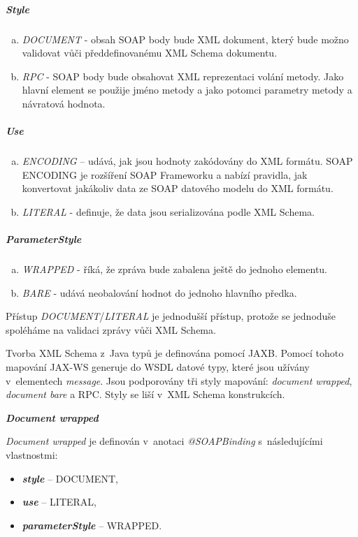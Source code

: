 \documentclass[11pt,twoside,a4paper]{book}
\begin{document}
\subparagraph{Style}
  	\begin{enumerate}[(a)]
  	  \item \textit{DOCUMENT} - obsah SOAP body bude XML dokument, který
  	  bude možno validovat vůči předdefinovanému XML Schema dokumentu.
  	  \item \textit{RPC} - SOAP body bude obsahovat XML reprezentaci volání
  	  metody.
Jako hlavní element se použije jméno metody a jako potomci parametry metody a
návratová hodnota.
	\end{enumerate}
\subparagraph{Use}
	\begin{enumerate}[(a)]
	  \item \textit{ENCODING} – udává, jak jsou hodnoty zakódovány do XML
	  formátu.
SOAP ENCODING je rozšíření SOAP Frameworku a nabízí pravidla, jak
konvertovat jakákoliv data ze SOAP datového modelu do XML formátu.
	  \item \textit{LITERAL} - definuje, že data jsou serializována podle
	  XML Schema.
	\end{enumerate}
\subparagraph{ParameterStyle}
	\begin{enumerate}[(a)]
	  \item \textit{WRAPPED} - říká, že zpráva bude zabalena ještě do
	  jednoho elementu.
	  \item \textit{BARE} - udává neobalování hodnot do jednoho hlavního
	  předka.
	\end{enumerate}

Přístup {\em DOCUMENT}/{\em LITERAL} je jednodušší přístup, protože se jednoduše
spoléháme na validaci zprávy vůči XML Schema.

Tvorba XML Schema z~Java typů je definována pomocí JAXB. Pomocí tohoto mapování
JAX-WS generuje do WSDL datové typy, které jsou užívány v~elementech {\em
message}. Jsou podporovány tři styly mapování: {\em document wrapped}, {\em
document bare} a RPC. Styly se liší v~XML Schema konstrukcích.

\textbf{\textit{Document wrapped}}

{\em Document wrapped} je definován v~anotaci {\em @SOAPBinding} s~následujícími
vlastnostmi:

\begin{itemize}
  \item \textbf{\textit{style}} – DOCUMENT,
  \item \textbf{\textit{use}} – LITERAL,
  \item \textbf{\textit{parameterStyle}} – WRAPPED.
\end{itemize}
\end{document}
